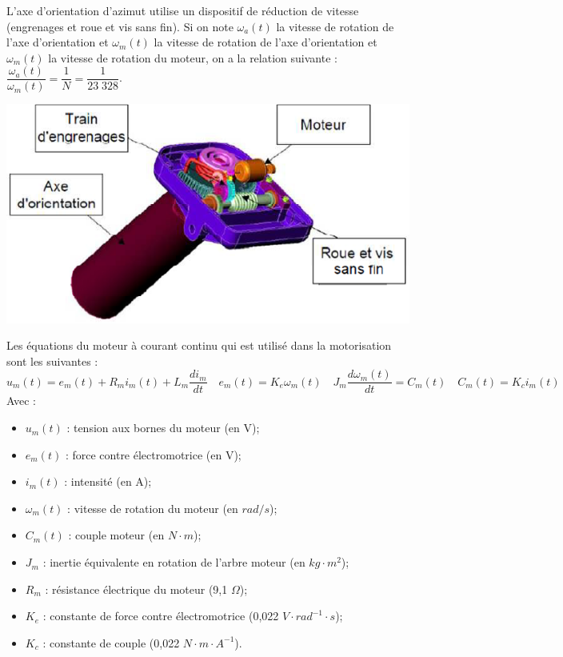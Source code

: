 \documentclass[10pt]{article}
\begin{document}
\begin{minipage}[c]{.68\linewidth}
L'axe d'orientation d'azimut utilise un dispositif de réduction de vitesse (engrenages et roue et vis sans fin). Si on note $\omega_a(t)$ la vitesse de rotation de l'axe d'orientation et $\omega_m(t)$ la vitesse de rotation de l'axe d'orientation et $\omega_m(t)$ la vitesse de rotation du moteur, on a la relation suivante : $\dfrac{\omega_a(t)}{\omega_m(t)}=\dfrac{1}{N}=\dfrac{1}{23\; 328}$. 

\end{minipage} \hfill
\begin{minipage}[c]{.3\linewidth}
\begin{center}
\includegraphics[width=\textwidth]{images/exo2_2}
\end{center}
\end{minipage}


Les équations du moteur à courant continu qui est utilisé dans la motorisation sont les suivantes :
$$
 u_m(t)=e_m(t)+R_mi_m(t)+L_m\dfrac{di_m}{dt} 
 \quad e_m(t)=K_e\omega_m(t) 
 \quad J_m\dfrac{d\omega_m(t)}{dt}=C_m(t)
 \quad C_m(t)=K_ci_m(t)
 $$
 Avec : 
 
 \begin{itemize}
 \item $u_m(t)$ : tension aux bornes du moteur (en V);
 \item $e_m(t)$ : force contre électromotrice (en V);
 \item $i_m(t)$ : intensité (en A);
 \item $\omega_m(t)$ : vitesse de rotation du moteur (en $rad/s$);
 \item $C_m(t)$ : couple moteur (en $N\cdot m$);
 \item $J_m$ : inertie équivalente en rotation de l'arbre moteur (en $kg\cdot m^2$);
 \item $R_m$ : résistance électrique du moteur (9,1 $\Omega$);
 \item $K_e$ : constante de force contre électromotrice (0,022 $V\cdot rad^{-1}\cdot s$);
 \item $K_c$ : constante de couple (0,022 $N\cdot m\cdot A^{-1}$).
 \end{itemize}
   
\end{document}
